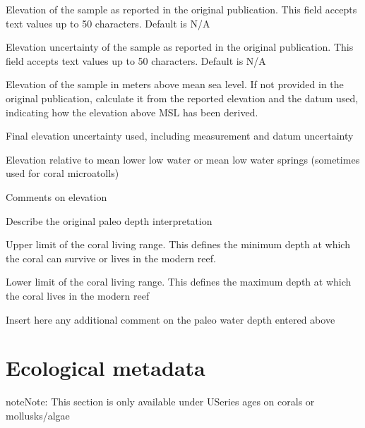 \documentclass[letterpaper,10pt,english]{sphinxmanual}
\begin{document}
 \sphinxhyphen{} Elevation of the sample as reported in the original publication. This field accepts text values up to 50 characters. Default is N/A

 \sphinxhyphen{} Elevation uncertainty of the sample as reported in the original publication. This field accepts text values up to 50 characters. Default is N/A

 \sphinxhyphen{} Elevation of the sample in meters above mean sea level. If not provided in the original publication, calculate it from the reported elevation and the datum used, indicating how the elevation above MSL has been derived.

 \sphinxhyphen{} Final elevation uncertainty used, including measurement and datum uncertainty

 \sphinxhyphen{} Elevation relative to mean lower low water or mean low water springs (sometimes used for coral microatolls)

 \sphinxhyphen{} Comments on elevation

 \sphinxhyphen{} Describe the original paleo depth interpretation

 \sphinxhyphen{} Upper limit of the coral living range. This defines the minimum depth at which the coral can survive or lives in the modern reef.

 \sphinxhyphen{} Lower limit of the coral living range. This defines the maximum depth at which the coral lives in the modern reef

 \sphinxhyphen{} Insert here any additional comment on the paleo water depth entered above


\section{Ecological metadata}
\label{\detokenize{Useries:ecological-metadata}}
\begin{sphinxadmonition}{note}{Note:}
This section is only available under U\sphinxhyphen{}Series ages on corals or mollusks/algae
\end{sphinxadmonition}
\end{document}
